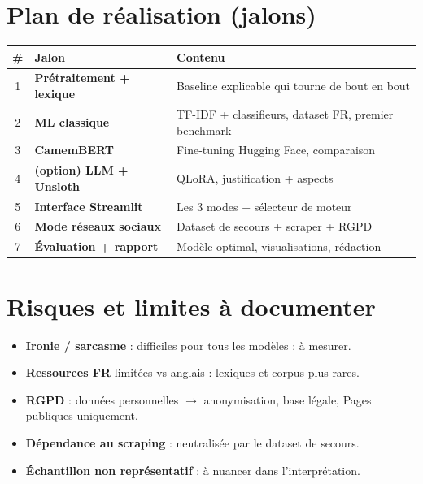 \documentclass[11pt,a4paper]{article}
\begin{document}
\section{Plan de réalisation (jalons)}

\begin{center}
\small
\begin{tabularx}{\linewidth}{c >{\bfseries}l X}
\toprule
\# & Jalon & Contenu \\
\midrule
1 & Prétraitement + lexique & Baseline explicable qui tourne de bout en bout \\
2 & ML classique & TF-IDF + classifieurs, dataset FR, premier benchmark \\
3 & CamemBERT & Fine-tuning Hugging Face, comparaison \\
4 & (option) LLM + Unsloth & QLoRA, justification + aspects \\
5 & Interface Streamlit & Les 3 modes + sélecteur de moteur \\
6 & Mode réseaux sociaux & Dataset de secours + scraper + RGPD \\
7 & Évaluation + rapport & Modèle optimal, visualisations, rédaction \\
\bottomrule
\end{tabularx}
\end{center}

\section{Risques et limites à documenter}
\begin{itemize}[leftmargin=1.2cm,nosep]
  \item \textbf{Ironie / sarcasme} : difficiles pour tous les modèles ; à mesurer.
  \item \textbf{Ressources FR} limitées vs anglais : lexiques et corpus plus rares.
  \item \textbf{RGPD} : données personnelles $\rightarrow$ anonymisation, base légale,
        Pages publiques uniquement.
  \item \textbf{Dépendance au scraping} : neutralisée par le dataset de secours.
  \item \textbf{Échantillon non représentatif} : à nuancer dans l'interprétation.
\end{itemize}

\end{document}
